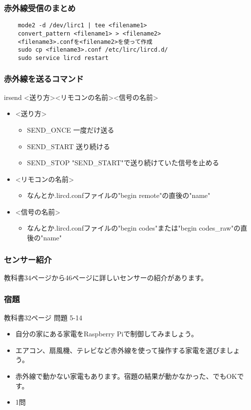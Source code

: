 \begin{frame}[fragile]
    \frametitle{赤外線受信のまとめ}
    \begin{lstlisting}
    mode2 -d /dev/lirc1 | tee <filename1>
    convert_pattern <filename1> > <filename2>
    <filename3>.confを<filename2>を使って作成
    sudo cp <filename3>.conf /etc/lirc/lircd.d/
    sudo service lircd restart
    \end{lstlisting}
\end{frame}

\begin{frame}
    \frametitle{赤外線を送るコマンド}
    irsend \textless 送り方\textgreater \textless リモコンの名前\textgreater \textless 信号の名前\textgreater

    \begin{itemize}
        \item \textless 送り方\textgreater
        \begin{itemize}
            \item SEND\_ONCE 一度だけ送る
            \item SEND\_START 送り続ける
            \item SEND\_STOP "SEND\_START"で送り続けていた信号を止める
        \end{itemize}
        \item \textless リモコンの名前\textgreater
        \begin{itemize}
            \item なんとか.lircd.confファイルの"begin remote"の直後の"name"
        \end{itemize}
        \item \textless 信号の名前\textgreater
        \begin{itemize}
            \item なんとか.lircd.confファイルの"begin codes"または"begin codes\_raw"の直後の"name"
        \end{itemize}
    \end{itemize}
\end{frame}

\begin{frame}
    \frametitle{センサー紹介}
    教科書34ページから46ページに詳しいセンサーの紹介があります。
\end{frame}

\begin{frame}
    \frametitle{宿題}
    教科書32ページ 問題 5-14
    \begin{itemize}
        \item 自分の家にある家電をRaspberry Piで制御してみましょう。
        \item エアコン、扇風機、テレビなど赤外線を使って操作する家電を選びましょう。
        \item 赤外線で動かない家電もあります。宿題の結果が動かなかった、でもOKです。
        \item 1問
    \end{itemize}
\end{frame}